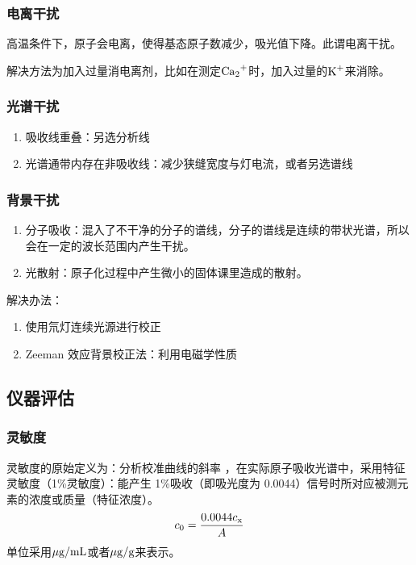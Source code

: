 \documentclass[UTF8,AutoFakeBold,b5paper]{ctexbook}
\begin{document}
\subsubsection{电离干扰}

高温条件下，原子会电离，使得基态原子数减少，吸光值下降。此谓\textcolor[rgb]{0.54,0.13,0.33}{电离干扰}。

解决方法为加入过量\textcolor[rgb]{0.54,0.13,0.33}{消电离剂}，\textcolor[rgb]{0.07,0.36,0.57}{比如在测定$\ce{Ca2+}$}时，加入过量的$\ce{K+}$来消除。

\subsubsection{光谱干扰}
\begin{enumerate}
	\item  吸收线重叠：另选分析线
	\item 光谱通带内存在非吸收线：\textcolor[rgb]{0.07,0.36,0.57}{减少狭缝宽度与灯电流，或者另选谱线}
\end{enumerate}
\subsubsection{背景干扰}
\begin{enumerate}
	\item  分子吸收：混入了不干净的分子的谱线，分子的谱线是连续的带状光谱，所以会在一定的波长范围内产生干扰。
	\item 光散射：原子化过程中产生微小的固体课里造成的散射。
\end{enumerate}

解决办法：
\begin{enumerate}
	\item 使用\textcolor[rgb]{0.54,0.13,0.33}{氘}灯连续光源进行校正
	\item Zeeman 效应背景校正法：利用电磁学性质
\end{enumerate}

\subsection{仪器评估}
\subsubsection{灵敏度}

灵敏度的原始定义为：\textcolor[rgb]{0.54,0.13,0.33}{分析校准曲线的斜率}
，在实际原子吸收光谱中，采用\textcolor[rgb]{0.54,0.13,0.33}{特征灵敏度（1\%灵敏度）}：能产生 1\%吸收（即吸光度为 0.0044）信号时所对应被测元素的浓度或质量（\textcolor[rgb]{0.54,0.13,0.33}{特征浓度}）。
\begin{equation}
	c_{0} = \dfrac{0.0044c_{\ce{x}}}{A}
\end{equation}
单位采用$\mu \ce{g}/\ce{mL}$或者$\mu \ce{g}/\ce{g}$来表示。
\end{document}
